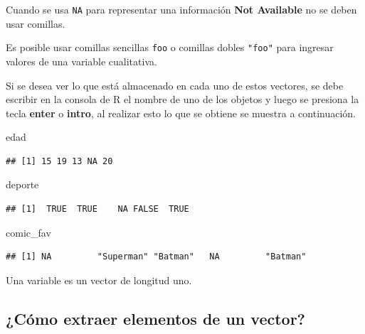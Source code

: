 \documentclass[
]{book}
\makeatletter
\newenvironment{Shaded}{\begin{snugshade}}{\end{snugshade}}
\newcommand{\NormalTok}[1]{#1}
\newenvironment{kframe}{%
\medskip{}
\setlength{\fboxsep}{.8em}
 \def\at@end@of@kframe{}%
 \ifinner\ifhmode%
  \def\at@end@of@kframe{\end{minipage}}%
  \begin{minipage}{\columnwidth}%
 \fi\fi%
 \def\FrameCommand##1{\hskip\@totalleftmargin \hskip-\fboxsep
 \colorbox{shadecolor}{##1}\hskip-\fboxsep
     \hskip-\linewidth \hskip-\@totalleftmargin \hskip\columnwidth}%
 \MakeFramed {\advance\hsize-\width
   \@totalleftmargin\z@ \linewidth\hsize
   \@setminipage}}%
 {\par\unskip\endMakeFramed%
 \at@end@of@kframe}
\renewenvironment{Shaded}{\begin{kframe}}{\end{kframe}}
\newenvironment{rmdblock}[1]
  {
  \begin{itemize}
  \renewcommand{\labelitemi}{
    \raisebox{-.7\height}[0pt][0pt]{
      {\setkeys{Gin}{width=3em,keepaspectratio}\texttt{[image: images/\#1]}}
    }
  }
  \setlength{\fboxsep}{1em}
  \begin{kframe}
  \item
  }
  {
  \end{kframe}
  \end{itemize}
  }
\newenvironment{rmdnote}
  {\begin{rmdblock}{note}}
  {\end{rmdblock}}
\newenvironment{rmdwarning}
  {\begin{rmdblock}{warning}}
  {\end{rmdblock}}
\makeatother
\begin{document}
\begin{rmdwarning}
Cuando se usa \texttt{NA} para representar una información \textbf{Not Available} no se deben usar comillas.
\end{rmdwarning}

\begin{rmdnote}
Es posible usar comillas sencillas \texttt{\textquotesingle{}foo\textquotesingle{}} o comillas dobles \texttt{"foo"} para ingresar valores de una variable cualitativa.
\end{rmdnote}

Si se desea ver lo que está almacenado en cada uno de estos vectores, se debe escribir en la consola de R el nombre de uno de los objetos y luego se presiona la tecla \textbf{enter} o \textbf{intro}, al realizar esto lo que se obtiene se muestra a continuación.

\begin{Shaded}
\begin{Highlighting}[]
\NormalTok{edad}
\end{Highlighting}
\end{Shaded}

\begin{verbatim}
## [1] 15 19 13 NA 20
\end{verbatim}

\begin{Shaded}
\begin{Highlighting}[]
\NormalTok{deporte}
\end{Highlighting}
\end{Shaded}

\begin{verbatim}
## [1]  TRUE  TRUE    NA FALSE  TRUE
\end{verbatim}

\begin{Shaded}
\begin{Highlighting}[]
\NormalTok{comic\_fav}
\end{Highlighting}
\end{Shaded}

\begin{verbatim}
## [1] NA         "Superman" "Batman"   NA         "Batman"
\end{verbatim}

\begin{rmdnote}
Una variable es un vector de longitud uno.
\end{rmdnote}

\hypertarget{cuxf3mo-extraer-elementos-de-un-vector}{%
\subsection{¿Cómo extraer elementos de un vector?}\label{cuxf3mo-extraer-elementos-de-un-vector}}
\end{document}
